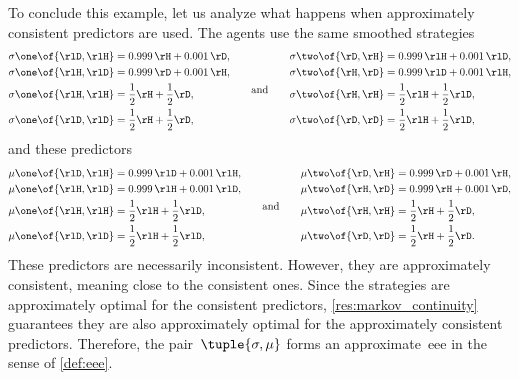 To conclude this example, let us analyze what happens when approximately consistent predictors are used.
The agents use the same smoothed strategies
\[
\begin{aligned}
\sigma\one \of{\rlD, \rlH} & = 0.999 \, \rH + 0.001 \, \rD, \\
\sigma\one \of{\rlH, \rlD} & = 0.999 \, \rD + 0.001 \, \rH, \\
\sigma\one \of{\rlH, \rlH} & = \frac{1}{2} \rH + \frac{1}{2} \rD, \\
\sigma\one \of{\rlD, \rlD} & = \frac{1}{2} \rH + \frac{1}{2} \rD, \\
\end{aligned}
\qquad\text{and}\qquad
\begin{aligned}
\sigma\two \of{\rD, \rH} & = 0.999 \, \rlH + 0.001 \, \rlD, \\
\sigma\two \of{\rH, \rD} & = 0.999 \, \rlD + 0.001 \, \rlH, \\
\sigma\two \of{\rH, \rH} & = \frac{1}{2} \rlH + \frac{1}{2} \rlD, \\
\sigma\two \of{\rD, \rD} & = \frac{1}{2} \rlH + \frac{1}{2} \rlD, \\
\end{aligned}
\]
and these predictors
\[
\begin{aligned}
\mu\one \of{\rlD, \rlH} & = 0.999 \, \rlD + 0.001 \, \rlH, \\
\mu\one \of{\rlH, \rlD} & = 0.999 \, \rlH + 0.001 \, \rlD, \\
\mu\one \of{\rlH, \rlH} & = \frac{1}{2} \rlH + \frac{1}{2} \rlD, \\
\mu\one \of{\rlD, \rlD} & = \frac{1}{2} \rlH + \frac{1}{2} \rlD, \\
\end{aligned}
\qquad\text{and}\qquad
\begin{aligned}
\mu\two \of{\rD, \rH} & = 0.999 \, \rD + 0.001 \, \rH, \\
\mu\two \of{\rH, \rD} & = 0.999 \, \rH + 0.001 \, \rD, \\
\mu\two \of{\rH, \rH} & = \frac{1}{2} \rH + \frac{1}{2} \rD, \\
\mu\two \of{\rD, \rD} & = \frac{1}{2} \rH + \frac{1}{2} \rD. \\
\end{aligned}
\]
These predictors are necessarily inconsistent.
However, they are approximately consistent, meaning close to the consistent ones.
Since the strategies are approximately optimal for the consistent predictors, \cref{res:markov_continuity} guarantees they are also approximately optimal for the approximately consistent predictors.
Therefore, the pair~\(\tuple{\sigma, \mu}\) forms an approximate~\ac{eee} in the sense of \cref{def:eee}.

